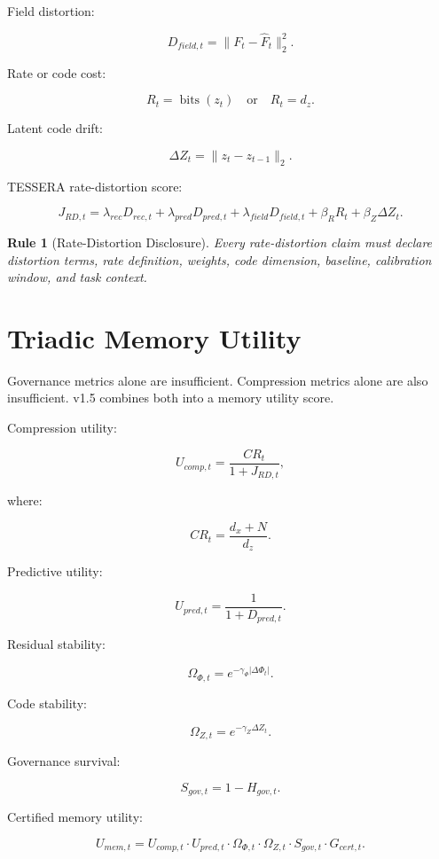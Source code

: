 \documentclass[12pt]{article}
\newtheorem{rulebox}{Rule}
\begin{document}
Field distortion:

\[
D_{field,t}=\|F_t-\hat{F}_t\|^2_2.
\]

Rate or code cost:

\[
R_t=\operatorname{bits}(z_t)\quad\text{or}\quad R_t=d_z.
\]

Latent code drift:

\[
\Delta Z_t=\|z_t-z_{t-1}\|_2.
\]

TESSERA rate-distortion score:

\[
\boxed{
J_{RD,t}
=
\lambda_{rec}D_{rec,t}
+
\lambda_{pred}D_{pred,t}
+
\lambda_{field}D_{field,t}
+
\beta_R R_t
+
\beta_Z\Delta Z_t.
}
\]

\begin{rulebox}[Rate-Distortion Disclosure]
Every rate-distortion claim must declare distortion terms, rate definition,
weights, code dimension, baseline, calibration window, and task context.
\end{rulebox}

\section{Triadic Memory Utility}

Governance metrics alone are insufficient. Compression metrics alone are also
insufficient. v1.5 combines both into a memory utility score.

Compression utility:

\[
U_{comp,t}=\frac{CR_t}{1+J_{RD,t}},
\]

where:

\[
CR_t=\frac{d_x+N}{d_z}.
\]

Predictive utility:

\[
U_{pred,t}=\frac{1}{1+D_{pred,t}}.
\]

Residual stability:

\[
\Omega_{\Phi,t}=e^{-\gamma_\Phi |\Delta\Phi_t|}.
\]

Code stability:

\[
\Omega_{Z,t}=e^{-\gamma_Z \Delta Z_t}.
\]

Governance survival:

\[
S_{gov,t}=1-H_{gov,t}.
\]

Certified memory utility:

\[
\boxed{
U_{mem,t}
=
U_{comp,t}\cdot U_{pred,t}\cdot\Omega_{\Phi,t}\cdot\Omega_{Z,t}
\cdot S_{gov,t}\cdot G_{cert,t}.
}
\]
\end{document}
